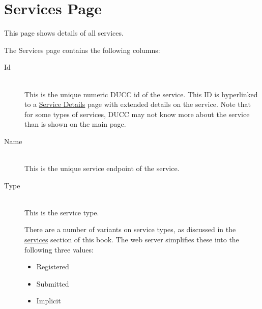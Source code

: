 
    \section{Services Page}
    \label{ws:services-page}
        This page shows details of all services.           

        The Services page contains the following columns: 
        \begin{description}

            \item[Id] \hfill \\
              This is the unique numeric DUCC id of the service.  This ID is hyperlinked to a
              \hyperref[sec:ws-service-details]{Service Details} page with extended
              details on the service.  Note that for some types of services, DUCC may not
              know more about the service than is shown on the main page.

            \item[Name] \hfill \\
              This is the unique service endpoint of the service.  
              
            \item[Type] \hfill \\
              This is the service type.
              
              There are a number of variants on service types, as discussed in the
              \hyperref[sec:services.types]{services} section of this book.  The web server
              simplifies these into the following three values:
              \begin{itemize}
                \item Registered
                \item Submitted
                \item Implicit
              \end{itemize}
              

\end{description}
